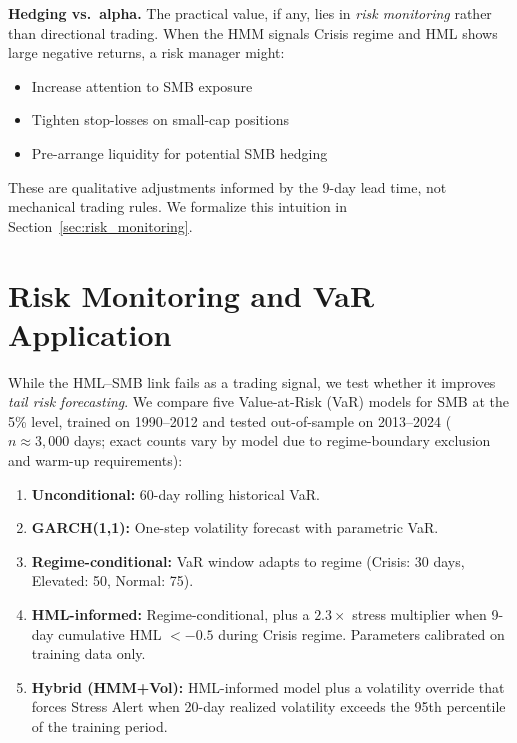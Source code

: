 \documentclass[sigconf,anonymous]{acmart}
\begin{document}
\textbf{Hedging vs.\ alpha.} The practical value, if any, lies in \emph{risk monitoring}
rather than directional trading. When the HMM signals Crisis regime and HML shows
large negative returns, a risk manager might:
\begin{itemize}
    \item Increase attention to SMB exposure
    \item Tighten stop-losses on small-cap positions
    \item Pre-arrange liquidity for potential SMB hedging
\end{itemize}

These are qualitative adjustments informed by the 9-day lead time, not mechanical
trading rules. We formalize this intuition in Section~\ref{sec:risk_monitoring}.

\section{Risk Monitoring and VaR Application}
\label{app:var}

While the HML--SMB link fails as a trading signal, we test whether it improves
\emph{tail risk forecasting}. We compare five Value-at-Risk (VaR) models for SMB
at the 5\% level, trained on 1990--2012 and tested out-of-sample on 2013--2024
($n \approx 3{,}000$ days; exact counts vary by model due to regime-boundary
exclusion and warm-up requirements):

\begin{enumerate}
    \item \textbf{Unconditional:} 60-day rolling historical VaR.
    \item \textbf{GARCH(1,1):} One-step volatility forecast with parametric VaR.
    \item \textbf{Regime-conditional:} VaR window adapts to regime
    (Crisis: 30 days, Elevated: 50, Normal: 75).
    \item \textbf{HML-informed:} Regime-conditional, plus a $2.3\times$ stress
    multiplier when 9-day cumulative HML $< -0.5$ during Crisis regime.
    Parameters calibrated on training data only.
    \item \textbf{Hybrid (HMM+Vol):} HML-informed model plus a volatility
    override that forces Stress Alert when 20-day realized volatility exceeds
    the 95th percentile of the training period.
\end{enumerate}
\end{document}
